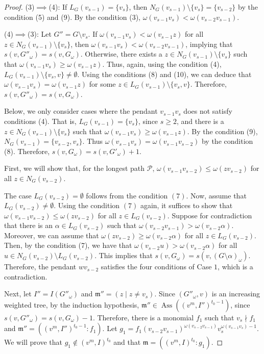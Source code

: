 \documentclass[12pt,amscd]{amsart}
\DeclareMathOperator{\ass}{Ass}
\theoremstyle{definition}
\def\P{{\mathcal P}}
\def\m {\mathfrak m}
\begin{document}
\begin{proof}
(3)$\implies$(4): If  $L_G(v_{s-1})=\{v_s\}$, then  $N_G(v_{s-1})\setminus \{v_s\}=\{v_{s-2}\}$  by the condition (5) and (9). By  the  condition (3),  $\omega(v_{s-1}v_s) < \omega(v_{s-2}v_{s-1})$.

(4)$\implies$(3): Let   $G''=G\setminus v_s$.  If $\omega(v_{s-1}v_s) < \omega(v_{s-1}z)$ for all $z\in N_G(v_{s-1})\setminus\{v_s\}$, then $\omega(v_{s-1}v_s) < \omega(v_{s-2}v_{s-1})$,  implying that $s(v,G''_{\omega})=s(v,G_\omega)$. Otherwise, there exists a $z\in N_G(v_{s-1})\setminus\{v_s\}$ such that $\omega(v_{s-1}v_s) \geqslant \omega(v_{s-1}z)$. Thus, again, using the condition (4),
$L_G(v_{s-1})\setminus\{v_s,v\}\neq \emptyset$.
Using the conditions (8) and (10), we can deduce that $\omega(v_{s-1}v_s)=\omega(v_{s-1}z)$ for some $z\in L_G(v_{s-1})\setminus\{v_s,v\}$. Therefore, $s(v,G''_{\omega})=s(v,G_\omega)$.

Below, we only consider cases where the pendant $v_{s-1}v_s$  does not satisfy conditions (4). That is,  $L_G(v_{s-1})=\{v_s\}$, since $s \geqslant 2$, and there is a $z\in N_G(v_{s-1})\setminus\{v_s\}$  such that $\omega(v_{s-1}v_s)\geqslant \omega(v_{s-1}z)$.  By the condition (9), $N_G(v_{s-1})=\{v_{s-2},v_s\}$. Thus $\omega(v_{s-1}v_{s})=\omega(v_{s-1}v_{s-2})$ by the condition (8).
Therefore,  $s(v,G_{\omega})=s(v,G'_\omega)+1$. 

First, we will show that, for the  longest path $\P$,   $\omega(v_{s-1}v_{s-2}) \leqslant \omega(zv_{s-2})$  for all  $z\in N_G(v_{s-2})$.

 The case $L_G(v_{s-2})=\emptyset$ follows from  the condition $(7)$.
Now, assume that $L_G(v_{s-2})\neq \emptyset$.   Using the condition $(7)$ again,  it suffices to show  that $\omega(v_{s-1}v_{s-2}) \leqslant \omega(zv_{s-2})$ 
for  all  $z\in L_G(v_{s-2})$. Suppose for contradiction that there is an  $\alpha \in L_G(v_{s-2})$ such that $\omega(v_{s-2}v_{s-1})> \omega(v_{s-2}\alpha)$. Moreover, we
can assume that  $\omega(zv_{s-2})\geqslant \omega(v_{s-2}\alpha)$ for all $z\in L_G(v_{s-2})$.
Then, by the condition  (7), we have that $\omega(v_{s-2}u)>\omega(v_{s-2}\alpha)$ for all $u\in N_G(v_{s-2})\setminus L_G(v_{s-2})$. This implies that 
$s(v,G_\omega)=s(v,(G\setminus \alpha)_{\omega})$. Therefore,  the pendant $wv_{s-2}$ satisfies  the  four conditions of Case $1$, which is a contradiction.


Next, let  $I''=I(G''_\omega)$ and $\m'' = (z\mid z\ne v_{s})$. Since $(G''_\omega,v)$ is an increasing weighted tree,  by  the induction hypothesis, $\m'' \in \ass((v^m,I'')^{t_0-1})$,  since $s(v,G''_\omega)=s(v,G_{\omega})-1$. Therefore, there is a monomial  $f_1$ such that  $v_{s}\nmid f_1$ and $\m'' = ((v^m,I'')^{t_0-1}\colon f_1)$. Let  $g_1= f_1(v_{s-2}v_{s-1})^{\omega(v_{s-2}v_{s-1})}v_{s}^{\omega(v_{s-1}v_{s})-1}$. We  will prove that  $g_1\notin (v^m,I)^{t_0}$ and that $\m = ((v^m,I)^{t_0}\colon g_1)$. 



\end{proof}
\end{document}
